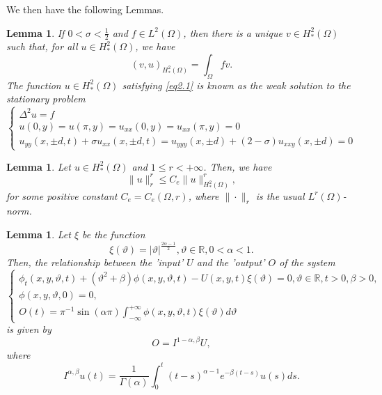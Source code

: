 \documentclass[12pt]{article}
\numberwithin{equation}{section}
\newtheorem{lemma}[theorem]{Lemma}
\begin{document}
We then have the following Lemmas.\\[0pt]
\begin{lemma}\cite{Ferr1} If $0<\sigma<\frac{1}{2}$ and $f \in L^{2}(\Omega)$, then there is a unique $v \in H^2_{*}(\Omega)$ such that, for all $u \in H^2_{*}(\Omega)$, we have
\begin{equation} \label{eq2.1}
(v, u)_{H^2_{*}(\Omega)}=\int_{\Omega} f v.
\end{equation}
The function $u \in H^2_{*}(\Omega)$ satisfying \eqref{eq2.1} is known as the weak solution to the stationary problem
\begin{equation}
\left\{\begin{array}{l}
\Delta^{2} u=f \\
u(0, y)=u(\pi, y)=u_{x x}(0, y)=u_{x x}(\pi, y)=0 \\
u_{y y}(x, \pm d, t)+\sigma u_{x x}(x, \pm d, t)=u_{y y y}(x, \pm d)+(2-\sigma) u_{x x y}(x, \pm d)=0
\end{array}\right.
\end{equation}
\end{lemma}
\begin{lemma} \cite{Wang} \label{lem2.2} Let $u \in H^2_{*}(\Omega)$ and $1 \leq r<+\infty$. Then, we have
\begin{equation}\label{eq2.3}
\|u\|_{r}^{r} \leq C_{e}\|u\|_{H^2_{*}(\Omega)}^{r},
\end{equation}
for some positive constant $C_{e}=C_{e}(\Omega, r)$, where $\|\cdot\|_{r}$ is the usual $L^{r}(\Omega)$-norm.\\[0pt]
\end{lemma}
\begin{lemma}\cite{BM}\label{le2} Let $\xi$ be the function
$$
\xi(\vartheta)=|\vartheta|^{\frac{2 \alpha-1}{2}}, \vartheta \in \mathbb{R}, 0<\alpha<1 .
$$
Then, the relationship between the 'input' $U$ and the 'output' $O$ of the system
\begin{equation}
\left\{\begin{array}{l}
\phi_t(x, y, \vartheta, t)+\left(\vartheta^{2}+\beta\right) \phi(x, y, \vartheta, t)-U(x, y, t) \xi(\vartheta)=0, \vartheta \in \mathbb{R}, t>0, \beta>0,\\
\phi(x, y, \vartheta, 0)=0, \\
O(t)=\pi^{-1} \sin (\alpha \pi) \displaystyle\int_{-\infty}^{+\infty} \phi(x, y, \vartheta, t) \xi(\vartheta) d \vartheta
\end{array}\right.
\end{equation}
is given by
$$
O=I^{1-\alpha, \beta} U,
$$
where
$$
I^{\alpha, \beta} u(t)=\frac{1}{\Gamma(\alpha)} \int_{0}^{t}(t-s)^{\alpha-1} e^{-\beta(t-s)} u(s) d s .
$$
\end{lemma}
\end{document}
